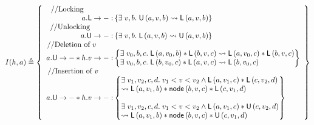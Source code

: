 \[
	I(h, a) \eqdef 
	\left\{
	\begin{array}{r @ {\hspace*{2pt}}l}
		\text{//Locking}\hspace*{1.4cm}&\\
		\lockT{a}: &\left\{ \exsts{v, b} \unlockedNode{a}{v}{b} \swap \lockedNode{a}{v}{b}\right\}\\
		
		\text{//Unlocking}\hspace*{1.1cm}&\\
		\unlockT{a}: & \left\{ \exsts{v, b} \lockedNode{a}{v}{b} \swap \unlockedNode{a}{v}{b}\right\}\\ 
		
		\text{//Deletion of } v \hspace*{0.8cm}&\\
		\unlockT{a} * \valueT{h}{v}: &
		\left\{
		\begin{array}{@{} l @{}}
			\exsts{v_0, b, c} \lockedNode{a}{v_0}{b} * \lockedNode{b}{v}{c} \swap \lockedNode{a}{v_0}{c} * \lockedNode{b}{v}{c}\\
			\exsts{v_0, b, c} \lockedNode{b}{v_0}{c} * \lockedNode{a}{v}{c} \swap \lockedNode{b}{v_0}{c}
			
		\end{array}
		\right\}\\ 

		
		\text{//Insertion of } v \hspace*{0.7cm}&\\
		\unlockT{a} * \valueT{h}{v}: &
		\left\{
		\begin{array}{@{} l @{}}
			\exsts{v_1, v_2, c, d} v_1 < v < v_2 \land \lockedNode{a}{v_1}{c} * \lockedNode{c}{v_2}{d} \\
			 \swap \lockedNode{a}{v_1}{b} * \node{b}{v}{c} *  \lockedNode{c}{v_1}{d}\\\\
			 
			 \exsts{v_1, v_2, c, d} v_1 < v < v_2 \land \lockedNode{a}{v_1}{c} * \unlockedNode{c}{v_2}{d} \\
			\swap \lockedNode{a}{v_1}{b} * \node{b}{v}{c} *  \unlockedNode{c}{v_1}{d}
						
		\end{array}
		\right\}\\ 
		
	\end{array}
	\right\}
\]
%
%
